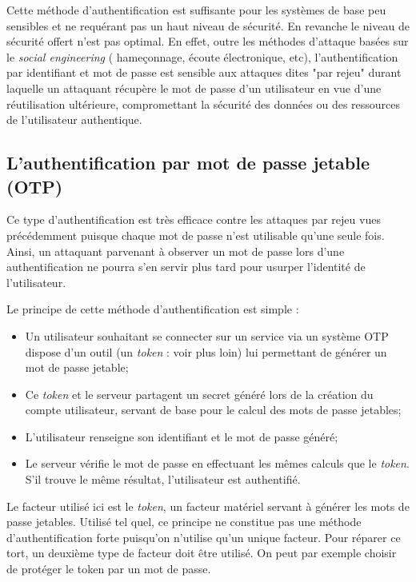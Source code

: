 	Cette méthode d'authentification est suffisante pour les systèmes de base
	peu sensibles et ne requérant pas un haut niveau de sécurité.	En
	revanche le niveau de sécurité offert n'est pas optimal. En effet, outre
	les méthodes d'attaque basées sur le \emph{social engineering} (
	hameçonnage, écoute électronique, etc), l'authentification par identifiant et
	mot de passe est sensible aux attaques dites "par rejeu" durant laquelle
	un attaquant récupère le mot de passe d'un utilisateur en vue d'une
	réutilisation ultérieure, compromettant la sécurité des données ou des
	ressources de l'utilisateur authentique.

\subsection{L'authentification par mot de passe jetable (OTP)}

	Ce type d'authentification est très efficace contre les attaques par rejeu vues précédemment puisque chaque mot de passe n'est utilisable qu'une
	seule fois. Ainsi, un attaquant parvenant à observer un mot de passe lors
	d'une authentification ne pourra s'en servir plus tard pour usurper
	l'identité de l'utilisateur.

	Le principe de cette méthode d'authentification est simple :
	\begin{itemize}
		\item Un utilisateur souhaitant se connecter sur un service via un
		système OTP dispose d'un outil (un \emph{token} : voir plus loin) lui
		permettant de générer un mot de passe jetable;

		\item Ce \emph{token} et le serveur partagent un secret généré lors de
		la création du compte utilisateur, servant de base pour le calcul des
		mots de passe jetables;
		\item L'utilisateur renseigne son identifiant et le mot de passe
		généré;
		\item Le serveur vérifie le mot de passe en effectuant les mêmes
		calculs que le \emph{token}. S'il trouve le même résultat,
		l'utilisateur est authentifié.
	\end{itemize}

	Le facteur utilisé ici est le \emph{token}, un facteur matériel servant à
	générer les mots de passe jetables. Utilisé tel quel, ce principe ne
	constitue pas une méthode d'authentification forte puisqu'on n'utilise
	qu'un unique facteur. Pour réparer ce tort, un deuxième type de facteur
	doit être utilisé. On peut par exemple choisir de protéger le token par un
	mot de passe.

